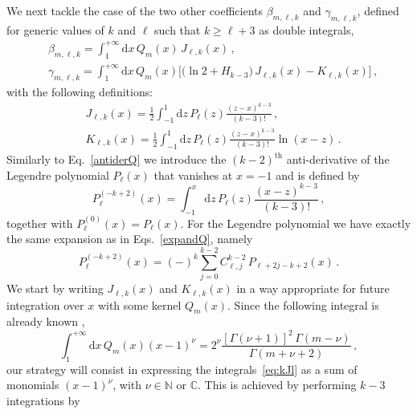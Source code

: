 \documentclass[prd,preprint,superscriptaddress,tightenlines,nofootinbib,
  eqsecnum,showpacs]{revtex4}
\newcommand{\ud}{\mathrm{d}}
\begin{document}
We next tackle the case of the two other coefficients
$\beta_{m,\ell,k}$ and $\gamma_{m,\ell,k}$, defined for generic values
of $k$ and $\ell$ such that $k\geqslant \ell +3$ as double integrals,
%
\begin{subequations} \label{eq:coeffs}
\begin{align} \label{eq:kmbetal}
& \beta_{m,\ell,k} = \int_1^{+\infty} \!\!\!\! \ud x \, Q_m(x)
  \,J_{\ell,k}(x) \, , \\ \label{eq:kmgammal} & \gamma_{m,\ell,k} =
  \int_1^{+\infty} \!\!\!\! \ud x\, Q_m(x) \Big[ \bigl(\ln 2
    +H_{k-3}\bigr) \,J_{\ell,k}(x) - K_{\ell,k}(x) \Big] \, ,
\end{align}
\end{subequations}
%
with the following definitions:
%
\begin{subequations}\label{eq:kJl}
\begin{align} 
& J_{\ell,k}(x) = \frac{1}{2} \int_{-1}^1 \ud z \, P_\ell(z)
  \frac{(z-x)^{k-3}}{(k-3)!} \, , \\ & K_{\ell,k}(x) = \frac{1}{2}
  \int_{-1}^1 \ud z \, P_\ell(z) \frac{(z-x)^{k-3}}{(k-3)!} \ln
  (x-z)\, .
\end{align}
\end{subequations}
%
Similarly to Eq.~\eqref{antiderQ} we introduce the $(k-2)^\text{th}$
anti-derivative of the Legendre polynomial $P_\ell(x)$ that vanishes
at $x=-1$ and is defined by
%
\begin{equation}\label{antiderP}
P^{(-k+2)}_\ell(x) = \int_{-1}^{x}\ud z\, P_\ell(z)\frac{(x-z)^{k-3}}{(k-3)!}
\,,
\end{equation}
% 
together with $P^{(0)}_\ell(x)=P_\ell(x)$. For the Legendre polynomial
we have exactly the same expansion as in Eqs.~\eqref{expandQ}, namely
%
\begin{equation}\label{expandP}
P^{(-k+2)}_\ell(x) = (-)^k \sum_{j=0}^{k-2}
C_{\ell,j}^{k-2}\,P_{\ell+2j-k+2}(x)\,.
\end{equation}
%
We start by writing $J_{\ell,k}(x)$ and $K_{\ell,k}(x)$ in a way
appropriate for future integration over $x$ with some kernel
$Q_m(x)$. Since the following integral is already known \cite{GR},
%
\begin{equation}\label{intGR}
\int_1^{+\infty} \ud x\, Q_m(x) (x-1)^{\nu} = 2^{\nu}
\frac{[\Gamma(\nu+1)]^2\,\Gamma(m-\nu)}{\Gamma(m+\nu+2)}\,,
\end{equation}
%
our strategy will consist in expressing the integrals~\eqref{eq:kJl}
as a sum of monomials $(x-1)^\nu$, with $\nu\in \mathbb{N}$ or
$\mathbb{C}$. This is achieved by performing $k-3$ integrations by
\end{document}

